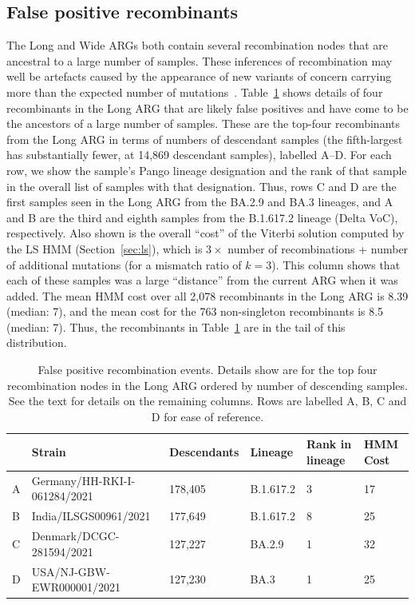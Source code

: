 \documentclass{article}
\begin{document}

\subsection{False positive recombinants}
\label{sec:false_positives}
The Long and Wide ARGs both contain several recombination nodes that are
ancestral to a large number of samples.
These inferences of recombination may well be artefacts
caused by the appearance of new variants of concern carrying
more than the expected number of mutations~\citep{otto2021origins}.
Table~\ref{tab:false_positive} shows details of four recombinants
in the Long ARG that are likely false positives and have come to be
the ancestors of a large number of samples. These are the top-four recombinants
from the Long ARG in terms of numbers of descendant samples
(the fifth-largest has substantially fewer, at 14,869 descendant samples),
labelled A--D.
For each row, we show the sample's Pango lineage
designation and the rank of that sample in the overall list of
samples with that designation. Thus, rows C and D are the first
samples seen in the Long ARG from the BA.2.9 and BA.3 lineages,
and A and B are the third and eighth samples from the B.1.617.2
lineage (Delta VoC), respectively. Also shown is the overall ``cost'' of the Viterbi
solution computed by the LS HMM (Section~\ref{sec:ls}), which
is $3 \times$ number of recombinations + number of additional mutations
(for a mismatch ratio of $k=3$).
This column shows that each of these samples was a large
``distance'' from the current ARG when it was added. The mean
HMM cost over all 2,078 recombinants in the Long ARG is 8.39
(median: 7), and the mean cost for the  763 non-singleton
recombinants is 8.5 (median: 7). Thus, the recombinants in
Table~\ref{tab:false_positive} are in the tail of this distribution.

\begin{table} \centering
\begin{tabular}{llllll}
\toprule
& Strain & Descendants & Lineage & Rank in lineage&HMM Cost \\
\midrule
A&Germany/HH-RKI-I-061284/2021 & 178,405    & B.1.617.2   & 3& 17  \\
B&India/ILSGS00961/2021        & 177,649    & B.1.617.2   & 8& 25   \\
C&Denmark/DCGC-281594/2021     & 127,227    & BA.2.9      & 1& 32 \\
D&USA/NJ-GBW-EWR000001/2021    & 127,230    & BA.3        & 1& 25 \\
\bottomrule
\end{tabular}
\caption{\label{tab:false_positive}
False positive recombination events. Details show are for the top
four recombination nodes in the Long ARG ordered by number of
descending samples. See the text for details on the remaining columns.
Rows are labelled A, B, C and D for ease of reference.}
\end{table}
\end{document}
